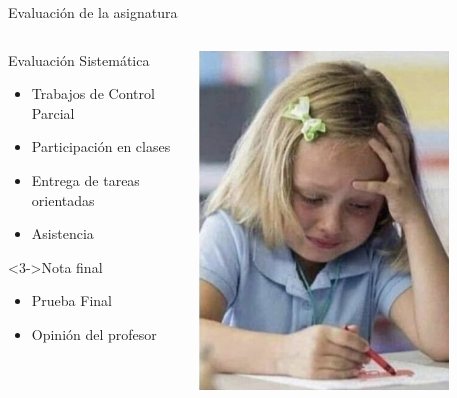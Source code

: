 \begin{frame}{Evaluaci\'on de la asignatura}
    \begin{columns}[T]
        \begin{column}{0.40\linewidth}
            \begin{block}{Evaluaci\'on Sistem\'atica}
        
                \begin{itemize}
                    \item Trabajos de Control Parcial
                    \item<2-> Participaci\'on en clases
                    \item<2-> Entrega de tareas orientadas
                    \item<2-> Asistencia
                \end{itemize}
            \end{block}    
            \vspace{10pt}
            \begin{block}<3->{Nota final}
                
                \begin{itemize}
                    \item Prueba Final
                    \item Opini\'on del profesor
                \end{itemize}
            \end{block}
        \end{column}
        
        \begin{column}{0.58\linewidth}
            \includegraphics[width=0.8\textwidth, height=0.8\textheight]{img/eval.jpg}
        \end{column}
    \end{columns}

   
\end{frame}